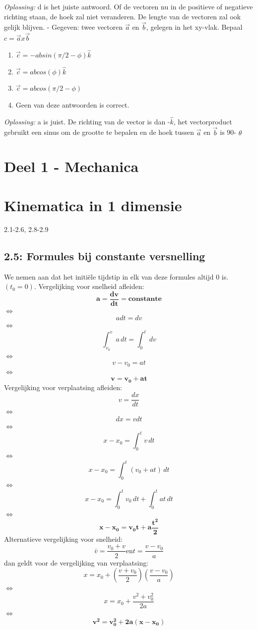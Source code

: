 \documentclass[12pt,a4paper]{article}
\begin{document}
	\textit{Oplossing:} d is het juiste antwoord. Of de vectoren nu in de positieve of negatieve richting staan, de hoek zal niet veranderen. De lengte van de vectoren zal ook gelijk blijven.
	\newline
	- Gegeven: twee vectoren $\overrightarrow{a}$ en $\overrightarrow{b}$, gelegen in het xy-vlak. Bepaal \(c = \overrightarrow{a} x \overrightarrow{b}\)
	\begin{enumerate}[label=\alph*)]
		\item \(\overrightarrow{c} = - ab sin(\pi/2 - \phi)\hat{k}\)
		\item \(\overrightarrow{c} = abcos(\phi)\hat{k}\)
		\item \(\overrightarrow{c} = abcos(\pi/2 - \phi)\)
		\item Geen van deze antwoorden is correct. 
	\end{enumerate}
	\textit{Oplossing:} a is juist. De richting van de vector is dan -$\hat{k}$, het vectorproduct gebruikt een sinus om de grootte te bepalen en de hoek tussen $\overrightarrow{a}$ en $\overrightarrow{b}$ is 90\degree - $\theta$
	\newpage
	\section{Deel 1 - Mechanica}
	\section{Kinematica in 1 dimensie}
	2.1-2.6, 2.8-2.9
	\subsection{2.5: Formules bij constante versnelling}
	We nemen aan dat het initiële tijdstip in elk van deze formules altijd 0 is. \((t_{0} = 0)\).
	Vergelijking voor snelheid afleiden: 
	\[\mathbf{a = \frac{dv}{dt} = constante}\]
	$\iff$ \[a dt = dv\]
	$\iff$ \[\int_{v_0}^{v} a \, dt = \int_{0}^{t} \,dv\]
	$\iff$\[v - v_0 = at\]
	$\iff$\[\mathbf{v = v_0 + at}\]
	Vergelijking voor verplaatsing afleiden: 
	\[v = \frac{dx}{dt}\]
	$\iff$\[dx = v dt\]
	$\iff$\[x - x_0 = \int_{0}^{t} v \, dt\]
	$\iff$\[x - x_0 = \int_{0}^{t} (v_0 + at) \, dt\]
	$\iff$\[x - x_0 = \int_{0}^{t} v_0 \, dt + \int_{0}^{t} at \, dt\]
	$\iff$\[\mathbf{x - x_0 = v_0t + a\frac{t^2}{2}}\]
	Alternatieve vergelijking voor snelheid: 
	\[\bar{v} = \frac{v_0 + v}{2} \text{en} t = \frac{v - v_0}{a}\]
	dan geldt voor de vergelijking van verplaatsing: 
	\[x = x_0 + (\frac{v + v_0}{2})(\frac{v - v_0}{a})\]
	$\iff$\[x = x_0 + \frac{v^2 + v_0^2}{2a}\]
	$\iff$\[\mathbf{v^2 = v_0^2 + 2a(x - x_0)}\]
\end{document}

